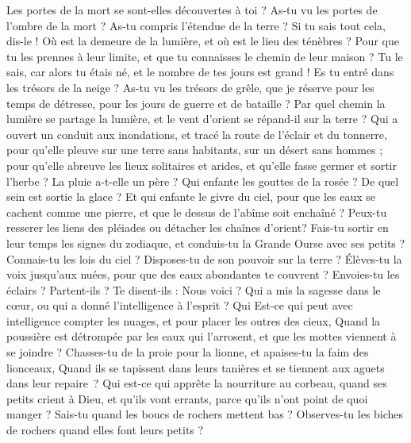 \begin{multicols}{2}
Les portes de la mort se sont-elles découvertes à toi ? As-tu vu les portes de l'ombre de la mort ?
As-tu compris l'étendue de la terre ? Si tu sais tout cela, dis-le !
Où est la demeure de la lumière, et où est le lieu des ténèbres ?
Pour que tu les prennes à leur limite, et que tu connaisses le chemin de leur maison ?
Tu le sais, car alors tu étais né, et le nombre de tes jours est grand !
Es tu entré dans les trésors de la neige ? As-tu vu les trésors de grêle,
que je réserve pour les temps de détresse, pour les jours de guerre et de bataille ?
Par quel chemin la lumière se partage la lumière, et le vent d'orient se répand-il sur la terre ?
Qui a ouvert un conduit aux inondations, et tracé la route de l'éclair et du tonnerre,
pour qu'elle pleuve sur une terre sans habitants, sur un désert sans hommes ;
pour qu'elle abreuve les lieux solitaires et arides, et qu'elle fasse germer et sortir l'herbe ?
La pluie a-t-elle un père ? Qui enfante les gouttes de la rosée ?
De quel sein est sortie la glace ? Et qui enfante le givre du ciel,
pour que les eaux se cachent comme une pierre, et que le dessus de l'abîme soit enchaîné ?
Peux-tu resserer les liens des pléiades ou détacher les chaînes d'orient?
Fais-tu sortir en leur temps les signes du zodiaque, et conduis-tu la Grande Ourse avec ses petits ?
Connais-tu les lois du ciel ? Disposes-tu de son pouvoir sur la terre ?
Élèves-tu la voix jusqu'aux nuées, pour que des eaux abondantes te couvrent ?
Envoies-tu les éclairs ? Partent-ils ? Te disent-ils : Nous voici ?
Qui a mis la sagesse dans le cœur, ou qui a donné l'intelligence à l'esprit ?
Qui Est-ce qui peut avec intelligence compter les nuages, et pour placer les outres des cieux,
Quand la poussière est détrompée par les eaux qui l'arrosent, et que les mottes viennent à se joindre ?
\VerseOne{}Chasses-tu de la proie pour la lionne, et apaises-tu la faim des lionceaux,
Quand ils se tapissent dans leurs tanières et se tiennent aux aguets dans leur repaire ?
Qui est-ce qui apprête la nourriture au corbeau, quand ses petits crient à Dieu, et qu'ils vont errants, parce qu'ils n'ont point de quoi manger ?
Sais-tu quand les boucs de rochers mettent bas ? Observes-tu les biches de rochers quand elles font leurs petits ?

\end{multicols}
